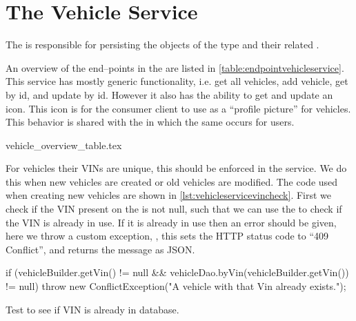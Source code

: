 \section{The Vehicle Service}\label{subsec:vehicleservice}

The  is responsible for persisting the objects of the type  and their related .

An overview of the end--points in the  are listed in \cref{table:endpointvehicleservice}.
This service has mostly generic functionality, i.e. get all vehicles, add vehicle, get by id, and update by id.
However it also has the ability to get and update an icon.
This icon is for the consumer client to use as a ``profile picture'' for vehicles.
This behavior is shared with the  in which the same occurs for users.

{vehicle_overview_table.tex}

For vehicles their \acp{VIN} are unique, this should be enforced in the service.
We do this when new vehicles are created or old vehicles are modified.
The code used when creating new vehicles are shown in \cref{lst:vehicleservicevincheck}.
First we check if the \ac{VIN} present on the  is not null,
such that we can use the  to check if the \ac{VIN} is already in use.
If it is already in use then an error should be given, here we throw a custom exception,
, this sets the HTTP status code to ``409 Conflict'', and returns the message as JSON.

\begin{listing}
    \begin{java2}
if (vehicleBuilder.getVin() != null && vehicleDao.byVin(vehicleBuilder.getVin()) != null) {
    throw new ConflictException("A vehicle with that Vin already exists.");
}
    \end{java2}
    \caption{Test to see if VIN is already in database.}\label{lst:vehicleservicevincheck}
\end{listing}
